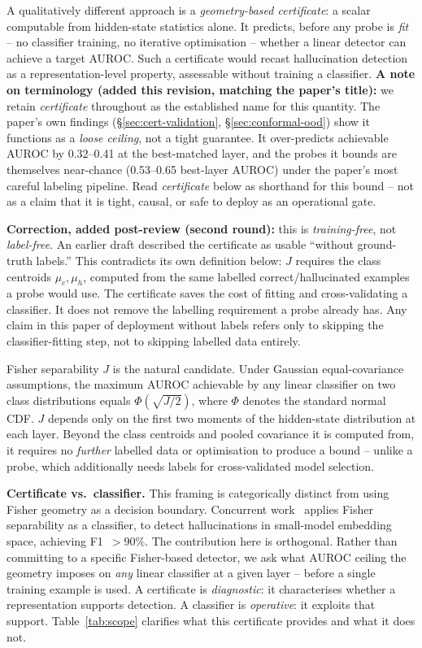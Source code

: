 \documentclass[onecolumn]{jmlr}
\begin{document}
A qualitatively different approach is a \emph{geometry-based
certificate}: a scalar computable from hidden-state statistics alone.
It predicts, before any probe is \emph{fit} -- no classifier training,
no iterative optimisation -- whether a linear detector can achieve a
target AUROC. Such a certificate would recast hallucination detection
as a representation-level property, assessable without training a
classifier.
\textbf{A note on terminology (added this revision, matching the paper's
title):} we retain \emph{certificate} throughout as the established name
for this quantity. The paper's own findings (\S\ref{sec:cert-validation},
\S\ref{sec:conformal-ood}) show it functions as a \emph{loose ceiling},
not a tight guarantee. It over-predicts achievable AUROC by 0.32--0.41
at the best-matched layer, and the probes it bounds are themselves
near-chance (0.53--0.65 best-layer AUROC) under the paper's most careful labeling
pipeline. Read \emph{certificate} below as shorthand for this bound --
not as a claim that it is tight, causal, or safe to deploy as an
operational gate.

\textbf{Correction, added post-review (second round):} this is
\emph{training-free}, not \emph{label-free}. An earlier draft described
the certificate as usable ``without ground-truth labels.'' This
contradicts its own definition below: $J$ requires the class centroids
$\mu_c, \mu_h$, computed from the same labelled correct/hallucinated
examples a probe would use. The certificate saves the cost of fitting
and cross-validating a classifier. It does not remove the labelling
requirement a probe already has. Any claim in this paper of deployment
without labels refers only to skipping the classifier-fitting step, not
to skipping labelled data entirely.

Fisher separability $J$ is the natural candidate. Under Gaussian
equal-covariance assumptions, the maximum AUROC achievable by any linear
classifier on two class distributions equals $\Phi(\sqrt{J/2})$, where
$\Phi$ denotes the standard normal CDF. $J$ depends only on the first
two moments of the hidden-state distribution at each layer. Beyond the
class centroids and pooled covariance it is computed from, it requires
no \emph{further} labelled data or optimisation to produce a bound --
unlike a probe, which additionally needs labels for cross-validated
model selection.

\textbf{Certificate vs.\ classifier.}
This framing is categorically distinct from using Fisher geometry as a
decision boundary. Concurrent work~\citep{ricco2026geometric} applies
Fisher separability as a classifier, to detect hallucinations in
small-model embedding space, achieving F1~$>90\%$. The contribution here
is orthogonal. Rather than committing to a specific Fisher-based
detector, we ask what AUROC ceiling the geometry imposes on \emph{any}
linear classifier at a given layer -- before a single training example
is used. A certificate is \emph{diagnostic}: it characterises whether a
representation supports detection.
A classifier is \emph{operative}: it exploits that support.
Table~\ref{tab:scope} clarifies what this certificate provides and what
it does not.
\end{document}
